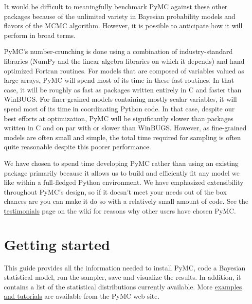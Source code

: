 \documentclass[letterpaper,10pt,english]{sphinxmanual}
\begin{document}
It would be difficult to meaningfully benchmark PyMC against these other packages because of the unlimited variety in Bayesian probability models and flavors of the MCMC algorithm. However, it is possible to anticipate how it will perform in broad terms.

PyMC's number-crunching is done using a combination of industry-standard libraries (NumPy and the linear algebra libraries on which it depends) and hand-optimized Fortran routines. For models that are composed of variables valued as large arrays, PyMC will spend most of its time in these fast routines. In that case, it will be roughly as fast as packages written entirely in C and faster than WinBUGS. For finer-grained models containing mostly scalar variables, it will spend most of its time in coordinating Python code. In that case, despite our best efforts at optimization, PyMC will be significantly slower than packages written in C and on par with or slower than WinBUGS. However, as fine-grained models are often small and simple, the total time required for sampling is often quite reasonable despite this poorer performance.

We have chosen to spend time developing PyMC rather than using an existing package primarily because it allows us to build and efficiently fit any model we like within a full-fledged Python environment. We have emphasized extensibility throughout PyMC's design, so if it doesn't meet your needs out of the box chances are you can make it do so with a relatively small amount of code. See the \href{https://github.com/pymc-devs/pymc/wiki/Testimonials}{testimonials} page on the wiki for reasons why other users have chosen PyMC.


\section{Getting started}
\label{README:getting-started}
This guide provides all the information needed to install PyMC, code
a Bayesian statistical model, run the sampler, save and visualize the results.
In addition, it contains a list of the statistical distributions currently available. More \href{https://github.com/pymc-devs/pymc/wiki}{examples and tutorials}  are available from the PyMC web site.
\end{document}
